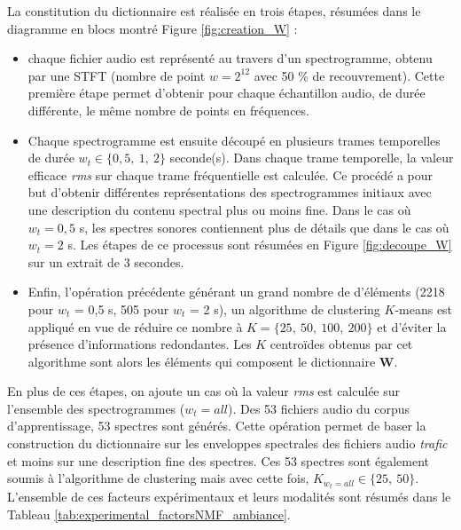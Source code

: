 La constitution du dictionnaire est réalisée en trois étapes, résumées dans le diagramme en blocs montré Figure \ref{fig:creation_W} :
\begin{itemize}
\item chaque fichier audio est représenté au travers d'un spectrogramme, obtenu par une STFT (nombre de point $w = 2^{12}$ avec 50 $\%$ de recouvrement). Cette première étape permet d'obtenir pour chaque échantillon audio, de durée différente, le même nombre de points en fréquences.
\item Chaque spectrogramme est ensuite découpé en plusieurs trames  temporelles de durée $w_t \in \lbrace 0,5,~ 1,~ 2\rbrace$ seconde(s). Dans chaque trame temporelle, la valeur efficace \textit{rms} sur chaque trame fréquentielle est calculée. Ce procédé a pour but d'obtenir différentes représentations des spectrogrammes initiaux avec une description du contenu spectral plus ou moins fine. Dans le cas où $w_t = 0,5$ s, les spectres sonores contiennent plus de détails que dans le cas où $w_t = 2$ s. Les étapes de ce processus sont résumées en Figure \ref{fig:decoupe_W} sur un extrait de 3 secondes.
\item Enfin, l'opération précédente générant un grand nombre de d'éléments (2218 pour $w_t$ = 0,5 s, 505 pour $w_t$ = 2 s),  un algorithme de clustering $K$-means est appliqué en vue de réduire ce nombre à $K = \lbrace 25,~50,~100,~200 \rbrace$ et d'éviter la présence d'informations redondantes. Les $K$ centroïdes obtenus par cet algorithme sont alors les éléments qui composent le dictionnaire $\mathbf{W}$.
\end{itemize}

En plus de ces étapes, on ajoute un cas où la valeur \textit{rms} est calculée sur l'ensemble des spectrogrammes ($w_t = all$). Des 53 fichiers audio du corpus d'apprentissage, 53 spectres sont générés. Cette opération permet de baser la construction du dictionnaire sur les enveloppes spectrales des fichiers audio \textit{trafic} et moins sur une description fine des spectres. Ces 53 spectres sont également soumis à l'algorithme de clustering mais avec cette fois, $K_{w_t = all} \in \lbrace 25,~ 50 \rbrace$.
L'ensemble de ces facteurs expérimentaux et leurs modalités sont résumés dans le Tableau \ref{tab:experimental_factorsNMF_ambiance}.

